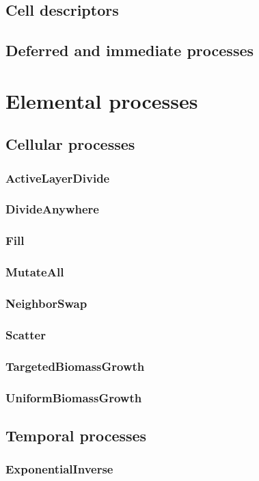 \documentclass[12pt]{scrartcl}
\begin{document}
\subsection{Cell descriptors}
\subsection{Deferred and immediate processes}

\section{Elemental processes}
\subsection{Cellular processes}
\subsubsection{ActiveLayerDivide}
\subsubsection{DivideAnywhere}
\subsubsection{Fill}
\subsubsection{MutateAll}
\subsubsection{NeighborSwap}
\subsubsection{Scatter}	
\subsubsection{TargetedBiomassGrowth}
\subsubsection{UniformBiomassGrowth}
\subsection{Temporal processes}
\subsubsection{ExponentialInverse}
\end{document}
